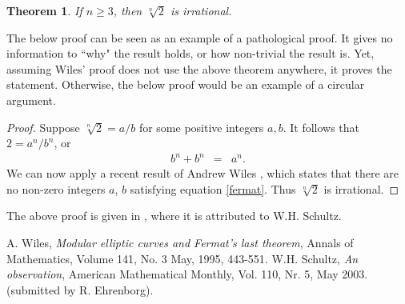 \documentclass[12pt]{article}
\newtheorem{thm}{Theorem}
\begin{document}

\begin{thm} If $n\ge 3$, then $\sqrt[n]{2}$ is irrational.
\end{thm}

The below proof can be seen as an example of a pathological proof. 
It gives no information to ``why" the result holds, or 
how non-trivial the result is. 
Yet, assuming Wiles' proof does not use the above theorem anywhere, 
it proves the statement. Otherwise, the below proof would be an
example of a circular argument. 

\begin{proof}
Suppose $\sqrt[n]{2}=a/b$ for some positive integers $a,b$. It follows that
$2=a^n/b^n$, or
\begin{eqnarray}
\label{fermat}
b^n + b^n &=& a^n.
\end{eqnarray}
We can now apply a recent result of Andrew Wiles \cite{wiles},
which states that there are no non-zero integers $a$, $b$ satisfying equation \eqref{fermat}.
Thus $\sqrt[n]{2}$ is irrational. 
\end{proof}
 
The above proof is given in \cite{abobs}, where it is attributed to W.H. Schultz.
 
\begin{thebibliography}{99}
 A. Wiles, \emph{Modular elliptic curves and Fermat's last theorem},
Annals of Mathematics, Volume 141, No. 3 May, 1995, 443-551. 
 W.H. Schultz, \emph{An observation},
American Mathematical Monthly, Vol. 110, Nr. 5, May 2003.
(submitted by R. Ehrenborg).
\end{thebibliography}
\end{document}
